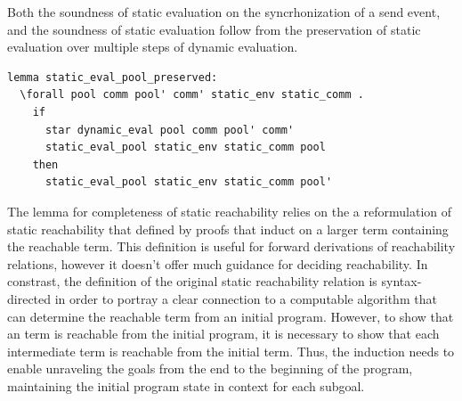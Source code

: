 \documentclass[10pt]{article}
\begin{document}
Both the soundness of static evaluation on the syncrhonization of a send event,
and the soundness of static evaluation follow from
the preservation of static evaluation over multiple steps of dynamic evaluation.

\begin{lstlisting}[language=logic, mathescape]
  lemma static_eval_pool_preserved:
  \forall pool comm pool' comm' static_env static_comm .
    if
      star dynamic_eval pool comm pool' comm' 
      static_eval_pool static_env static_comm pool
    then
      static_eval_pool static_env static_comm pool'
\end{lstlisting}

The lemma for completeness of static reachability relies on the a reformulation of
static reachability that defined by proofs that induct on a larger term
containing the reachable term.  This definition is useful for forward derivations
of reachability relations, however it doesn't offer much guidance for deciding reachability. 
In constrast, the definition of the original static reachability relation is
syntax-directed in order to portray a clear connection to
a computable algorithm that can determine the reachable term from an initial program.
However, to show that an term is reachable from the initial program, it is necessary to
show that each intermediate term is reachable from the initial term.  Thus, the
induction needs to enable unraveling the goals from the end to the beginning of the program,
maintaining the initial program state in context for each subgoal.
\end{document}
